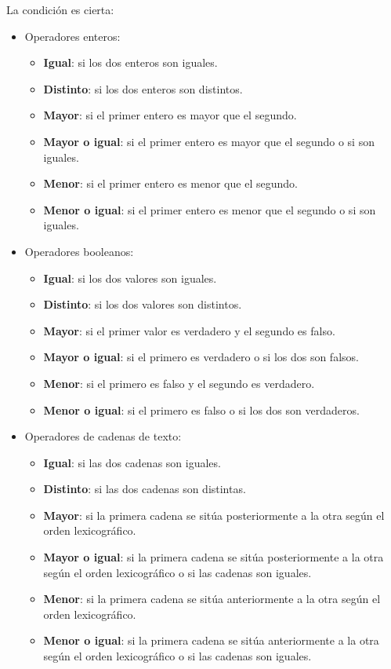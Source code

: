 La condición es cierta:
\begin{itemize}
	\item Operadores enteros:
	\begin{itemize}
		\item \textbf{Igual}: si los dos enteros son iguales.
		\item \textbf{Distinto}: si los dos enteros son distintos.
		\item \textbf{Mayor}: si el primer entero es mayor que el segundo.
		\item \textbf{Mayor o igual}: si el primer entero es mayor que el segundo o si son iguales.
		\item \textbf{Menor}: si el primer entero es menor que el segundo.
		\item \textbf{Menor o igual}: si el primer entero es menor que el segundo o si son iguales.
	\end{itemize}
	\item Operadores booleanos:
	\begin{itemize}
		\item \textbf{Igual}: si los dos valores son iguales.
		\item \textbf{Distinto}: si los dos valores son distintos.
		\item \textbf{Mayor}: si el primer valor es verdadero y el segundo es falso.
		\item \textbf{Mayor o igual}: si el primero es verdadero o si los dos son falsos.
		\item \textbf{Menor}: si el primero es falso y el segundo es verdadero.
		\item \textbf{Menor o igual}: si el primero es falso o si los dos son verdaderos.
	\end{itemize}
	\item Operadores de cadenas de texto:
	\begin{itemize}
		\item \textbf{Igual}: si las dos cadenas son iguales.
		\item \textbf{Distinto}: si las dos cadenas son distintas.
		\item \textbf{Mayor}: si la primera cadena se sitúa posteriormente a la otra según el orden lexicográfico.
		\item \textbf{Mayor o igual}: si la primera cadena se sitúa posteriormente a la otra según el orden lexicográfico o si las cadenas son iguales.
		\item \textbf{Menor}: si la primera cadena se sitúa anteriormente a la otra según el orden lexicográfico.
		\item \textbf{Menor o igual}: si la primera cadena se sitúa anteriormente a la otra según el orden lexicográfico o si las cadenas son iguales.
	\end{itemize}
\end{itemize}
 

